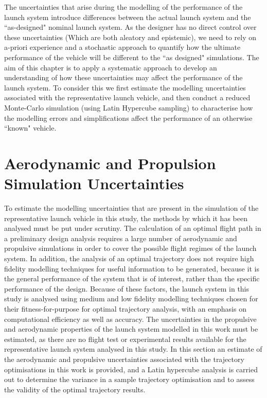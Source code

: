 The uncertainties that arise during the modelling of the performance of the launch system introduce differences between the actual launch system and the ``as-designed" nominal launch system. 
As the designer has no direct control over these uncertainties (Which are both aleatory and epistemic), we need to rely on a-priori experience and a stochastic approach to quantify how the ultimate performance of the vehicle will be different to the ``as designed" simulations. The aim of this chapter is to apply a systematic approach to develop an understanding of how these uncertainties may affect the performance of the launch system. To consider this we first estimate the modelling uncertainties associated with the representative launch vehicle, and then conduct a reduced Monte-Carlo simulation (using Latin Hypercube sampling) to characterise how the modelling errors and simplifications affect the performance of an otherwise ``known" vehicle.




 







\section{Aerodynamic and Propulsion Simulation Uncertainties}\label{sec:aerounc}

To estimate the modelling uncertainties that are present in the simulation of the representative launch vehicle in this study, the methods by which it has been analysed must be put under scrutiny. 
The calculation of an optimal flight path in a preliminary design analysis requires a large number of aerodynamic and propulsive simulations in order to cover the possible flight regimes of the launch system. In addition, the analysis of an optimal trajectory does not require high fidelity modelling techniques for useful information to be generated, because it is the general performance of the system that is of interest, rather than the specific performance of the design. Because of these factors, the launch system in this study is analysed using medium and low fidelity modelling techniques chosen for their fitness-for-purpose for optimal trajectory analysis, with an emphasis on computational efficiency as well as accuracy.
The uncertainties in the propulsive and aerodynamic properties of the launch system modelled in this work must be estimated, as there are no flight test or experimental results available for the representative launch system analysed in this study. In this section an estimate of the aerodynamic and propulsive uncertainties associated with the trajectory optimisations in this work is provided, and a Latin hypercube analysis is carried out to determine the variance in a sample trajectory optimisation and to assess the validity of the optimal trajectory results. 

